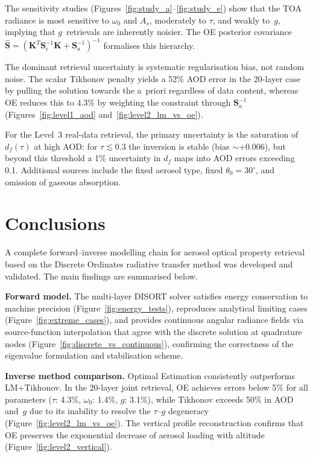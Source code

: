 \documentclass[a4paper, 11pt]{article}
\begin{document}
The sensitivity studies (Figures~\ref{fig:study_a}--\ref{fig:study_e}) show that the TOA radiance is most sensitive to $\omega_0$ and $A_s$, moderately to $\tau$, and weakly to~$g$, implying that $g$~retrievals are inherently noisier.  The OE posterior covariance $\hat{\mathbf{S}} = (\mathbf{K}^T \mathbf{S}_\epsilon^{-1} \mathbf{K} + \mathbf{S}_a^{-1})^{-1}$ \cite{rodgers2000} formalises this hierarchy.

The dominant retrieval uncertainty is systematic regularisation bias, not random noise.  The scalar Tikhonov penalty yields a 52\% AOD error in the 20-layer case by pulling the solution towards the a~priori regardless of data content, whereas OE reduces this to 4.3\% by weighting the constraint through $\mathbf{S}_a^{-1}$ (Figures~\ref{fig:level1_aod} and~\ref{fig:level2_lm_vs_oe}).

For the Level~3 real-data retrieval, the primary uncertainty is the saturation of $d_f(\tau)$ at high AOD: for $\tau \lesssim 0.3$ the inversion is stable (bias $\sim +0.006$), but beyond this threshold a 1\% uncertainty in $d_f$ maps into AOD errors exceeding 0.1.  Additional sources include the fixed aerosol type, fixed $\theta_0 = 30^{\circ}$, and omission of gaseous absorption.

\section{Conclusions}
\label{sec:conclusions}

A complete forward--inverse modelling chain for aerosol optical property retrieval based on the Discrete Ordinates radiative transfer method was developed and validated.  The main findings are summarised below.

\textbf{Forward model.}  The multi-layer DISORT solver satisfies energy conservation to machine precision (Figure~\ref{fig:energy_tests}), reproduces analytical limiting cases (Figure~\ref{fig:extreme_cases}), and provides continuous angular radiance fields via source-function interpolation that agree with the discrete solution at quadrature nodes (Figure~\ref{fig:discrete_vs_continuous}), confirming the correctness of the eigenvalue formulation and stabilisation scheme.

\textbf{Inverse method comparison.}  Optimal Estimation consistently outperforms LM+Tikhonov.  In the 20-layer joint retrieval, OE achieves errors below 5\% for all parameters ($\tau$: 4.3\%, $\omega_0$: 1.4\%, $g$: 3.1\%), while Tikhonov exceeds 50\% in AOD and~$g$ due to its inability to resolve the $\tau$--$g$ degeneracy (Figure~\ref{fig:level2_lm_vs_oe}).  The vertical profile reconstruction confirms that OE preserves the exponential decrease of aerosol loading with altitude (Figure~\ref{fig:level2_vertical}).
\end{document}

